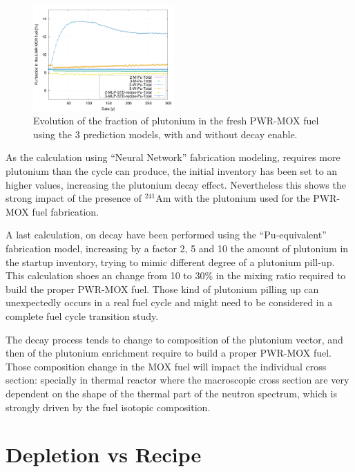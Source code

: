 \documentclass{anstrans}
\begin{document}
\begin{figure}[ht] %
  \centering
  \includegraphics[width=0.48\textwidth]{decay_pu_contribution.png}
  \caption{Evolution of the fraction of plutonium in the fresh PWR-MOX fuel
  using the 3 prediction models, with and without decay enable.}
  \label{fig:d}
\end{figure}

As the calculation using ``Neural Network'' fabrication modeling, requires more
plutonium than the cycle can produce, the initial inventory has been set to an
higher values, increasing the plutonium decay effect. Nevertheless this shows
the strong impact of the presence of $^{241}$Am with the plutonium used for the
PWR-MOX fuel fabrication.

A last calculation, on decay have been performed using the ``Pu-equivalent''
fabrication model, increasing by a factor 2, 5 and 10 the amount of plutonium in
the startup inventory, trying to mimic different degree of a plutonium pill-up.
This calculation shoes an change from 10 to 30\% in the mixing ratio required to
build the proper PWR-MOX fuel. Those kind of plutonium pilling up can
unexpectedly occurs in a real fuel cycle and might need to be considered in a
complete fuel cycle transition study.

The decay process tends to change to composition of the plutonium vector, and
then of the plutonium enrichment require to build a proper PWR-MOX fuel. Those
composition change in the MOX fuel will impact the individual cross section:
specially in thermal reactor where the macroscopic cross section are very
dependent on the shape of the thermal part of the neutron spectrum, which is
strongly driven by the fuel isotopic composition.


\section{Depletion vs Recipe}
\end{document}
